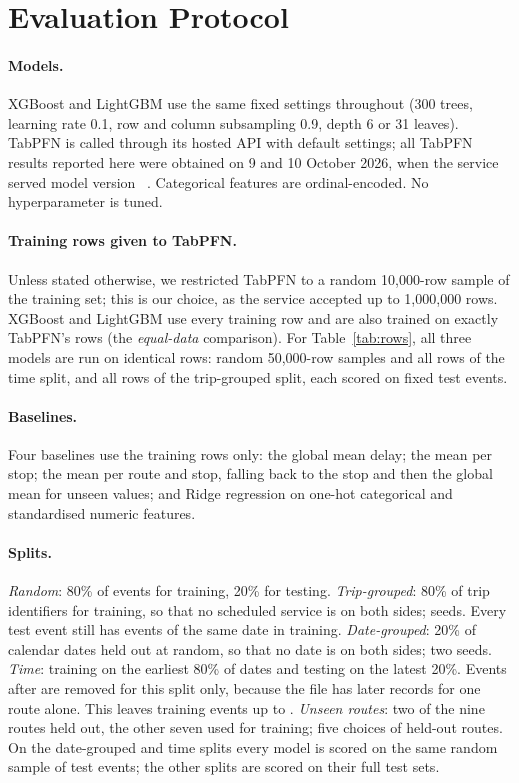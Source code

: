 \documentclass[runningheads]{llncs}
\begin{document}
\section{Evaluation Protocol}
\label{sec:protocol}
\paragraph{Models.}
XGBoost and LightGBM use the same fixed settings throughout (300 trees,
learning rate 0.1, row and column subsampling 0.9, depth 6 or 31 leaves).
TabPFN is called through its hosted API with default settings; all TabPFN
results reported here were obtained on 9 and 10 October 2026, when the service
served model version \ServedModel{}~\cite{jaeger2026tabpfn35}. Categorical
features are ordinal-encoded. No hyperparameter is tuned.

\paragraph{Training rows given to TabPFN.}
Unless stated otherwise, we restricted TabPFN to a random 10{,}000-row sample
of the training set; this is our choice, as the service accepted up to
1{,}000{,}000 rows. XGBoost and LightGBM use every training row and are also
trained on exactly TabPFN's rows (the \emph{equal-data} comparison). For
Table~\ref{tab:rows}, all three models are run on identical rows: random
50{,}000-row samples and all rows of the time split, and all rows of the
trip-grouped split, each scored on \FixedTestCap{} fixed test events.

\paragraph{Baselines.}
Four baselines use the training rows only: the global mean delay; the mean
per stop; the mean per route and stop, falling back to the stop and then the
global mean for unseen values; and Ridge regression on one-hot categorical
and standardised numeric features.

\paragraph{Splits.}
\emph{Random}: 80\% of events for training, 20\% for testing.
\emph{Trip-grouped}: 80\% of trip identifiers for training, so that no
scheduled service is on both sides; \TripSeeds{} seeds. Every test event
still has events of the same date in training.
\emph{Date-grouped}: 20\% of calendar dates held out at random, so that no
date is on both sides; two seeds.
\emph{Time}: training on the earliest 80\% of dates and testing on the latest
20\%. Events after \CutoffDate{} are removed for this split only, because the
file has later records for one route alone. This leaves \TimeTrainRows{}
training events up to \TimeTrainLast{}.
\emph{Unseen routes}: two of the nine routes held out, the other seven used
for training; five choices of held-out routes.
On the date-grouped and time splits every model is scored on the same random
sample of \FixedTestCap{} test events; the other splits are scored on their
full test sets.
\end{document}
